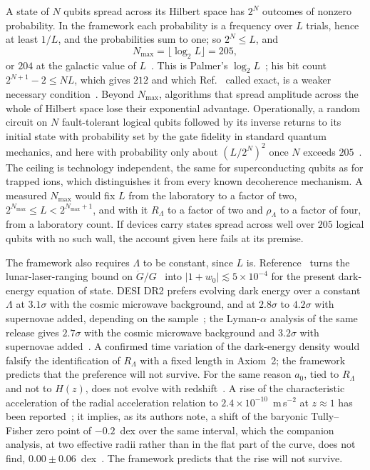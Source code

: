\documentclass[aps,prd,twocolumn,superscriptaddress,nofootinbib,showkeys]{revtex4-2}
\begin{document}
A state of $N$ qubits spread across its Hilbert space has $2^N$ outcomes of nonzero probability. In the framework each probability is a frequency over $L$ trials, hence at least $1/L$, and the probabilities sum to one; so $2^N\le L$, and
\begin{equation}
N_{\max} = \lfloor\log_2 L\rfloor = 205,
\label{eq:nmax}
\end{equation}
or $204$ at the galactic value of $L$~\cite{korytko2026c}. This is Palmer's $\log_2 L$~\cite{palmer2026}; his bit count $2^{N+1}-2\le NL$, which gives $212$ and which Ref.~\cite{korytko2026} called exact, is a weaker necessary condition~\cite{korytko2026c}. Beyond $N_{\max}$, algorithms that spread amplitude across the whole of Hilbert space lose their exponential advantage. Operationally, a random circuit on $N$ fault-tolerant logical qubits followed by its inverse returns to its initial state with probability set by the gate fidelity in standard quantum mechanics, and here with probability only about $(L/2^N)^2$ once $N$ exceeds $205$~\cite{korytko2026c}. The ceiling is technology independent, the same for superconducting qubits as for trapped ions, which distinguishes it from every known decoherence mechanism. A measured $N_{\max}$ would fix $L$ from the laboratory to a factor of two, $2^{N_{\max}}\le L<2^{N_{\max}+1}$, and with it $R_\Lambda$ to a factor of two and $\rho_\Lambda$ to a factor of four, from a laboratory count. If devices carry states spread across well over $205$ logical qubits with no such wall, the account given here fails at its premise.

The framework also requires $\Lambda$ to be constant, since $L$ is. Reference~\cite{korytko2026} turns the lunar-laser-ranging bound on $\dot G/G$~\cite{hofmann2018} into $|1+w_0|\lesssim5\times10^{-4}$ for the present dark-energy equation of state. DESI DR2 prefers evolving dark energy over a constant $\Lambda$ at $3.1\sigma$ with the cosmic microwave background, and at $2.8\sigma$ to $4.2\sigma$ with supernovae added, depending on the sample~\cite{desi2025}; the Lyman-$\alpha$ analysis of the same release gives $2.7\sigma$ with the cosmic microwave background and $3.2\sigma$ with supernovae added~\cite{desi2026}. A confirmed time variation of the dark-energy density would falsify the identification of $R_\Lambda$ with a fixed length in Axiom~2; the framework predicts that the preference will not survive. For the same reason $a_0$, tied to $R_\Lambda$ and not to $H(z)$, does not evolve with redshift~\cite{korytko2026}. A rise of the characteristic acceleration of the radial acceleration relation to $2.4\times10^{-10}$~m\,s$^{-2}$ at $z\approx1$ has been reported~\cite{ciocan2026}; it implies, as its authors note, a shift of the baryonic Tully--Fisher zero point of $-0.2$~dex over the same interval, which the companion analysis, at two effective radii rather than in the flat part of the curve, does not find, $0.00\pm0.06$~dex~\cite{jeanneau2026}. The framework predicts that the rise will not survive.
\end{document}
